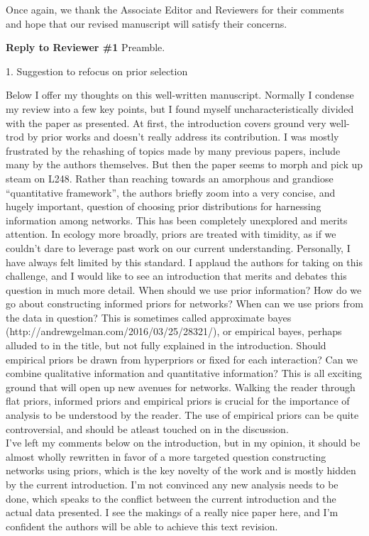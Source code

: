 \documentclass[12pt]{letter}
\newenvironment{refquote}{\bigskip \begin{it}}{\end{it}\smallskip}
\begin{document}
	Once again, we thank the Associate Editor and Reviewers for their comments and hope that our revised manuscript will satisfy their concerns.

\newpage


{\Large \bf Reply to Reviewer \#1}
Preamble.

	1. Suggestion to refocus on prior selection

		\begin{refquote}
			Below I offer my thoughts on this well-written manuscript. Normally I condense my review into a few key points, but I found myself uncharacteristically divided with the paper as presented. At first, the introduction covers ground very well-trod by prior works and doesn’t really address its contribution. I was mostly frustrated by the rehashing of topics made by many previous papers, include many by the authors themselves. But then the paper seems to morph and pick up steam on L248. Rather than reaching towards an amorphous and grandiose “quantitative framework”, the authors briefly zoom into a very concise, and hugely important, question of choosing prior distributions for harnessing information among networks. This has been completely unexplored and merits attention. In ecology more broadly, priors are treated with timidity, as if we couldn’t dare to leverage past work on our current understanding. Personally, I have always felt limited by this standard. I applaud the authors for taking on this challenge, and I would like to see an introduction that merits and debates this question in much more detail. When should we use prior information? How do we go about constructing informed priors for networks? When can we use priors from the data in question? This is sometimes called approximate bayes (http://andrewgelman.com/2016/03/25/28321/), or empirical bayes, perhaps alluded to in the title, but not fully explained in the introduction. Should empirical priors be drawn from hyperpriors or fixed for each interaction? Can we combine qualitative information and quantitative information? This is all exciting ground that will open up new avenues for networks. Walking the reader through flat priors, informed priors and empirical priors is crucial for the importance of analysis to be understood by the reader. The use of empirical priors can be quite controversial, and should be atleast touched on in the discussion. \\
			I’ve left my comments below on the introduction, but in my opinion, it should be almost wholly rewritten in favor of a more targeted question constructing networks using priors, which is the key novelty of the work and is mostly hidden by the current introduction. I’m not convinced any new analysis needs to be done, which speaks to the conflict between the current introduction and the actual data presented. I see the makings of a really nice paper here, and I’m confident the authors will be able to achieve this text revision.



\end{refquote}
\end{document}
